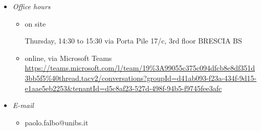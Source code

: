 \documentclass[trans]{beamer}
\newenvironment{stepitemize}{\begin{itemize}[<+->]}{\end{itemize} }
\begin{document}
\begin{frame}%



%

\begin{stepitemize}
\item \textit{Office hours}

\begin{stepitemize}
\item on site

Thursday, 14:30 to 15:30\newline
via Porta Pile 17/c, 3rd floor BRESCIA BS

\item online, via Microsoft Teams\newline
\url{https://teams.microsoft.com/l/team/19\%3A99055c375c094dfcb8e8df351d3bb5f5\%40thread.tacv2/conversations?groupId=d41ab093-f23a-434f-9d15-e1aae5eb2253&tenantId=d5c8af23-527d-498f-94b5-f9745fee3afc}%
\end{stepitemize}

\item \textit{E-mail}

\begin{stepitemize}
\item paolo.falbo@unibs.it
\end{stepitemize}
\end{stepitemize}

\transboxout%
\end{frame}%
\end{document}
